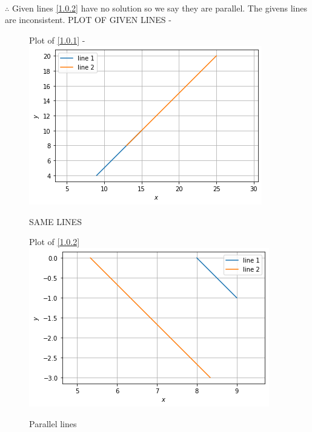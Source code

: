 \documentclass[journal,12pt,twocolumn]{IEEEtran}
\begin{document}
\begin{enumerate}
\begin{align}
\end{align}
$\therefore$ Given lines \eqref{1.0.2} have no solution so we say they are parallel. The givens lines are inconsistent. 
PLOT OF GIVEN LINES -
\begin{figure}[ht!]
Plot of \eqref{1.0.1} -
    \centering
    \includegraphics[width=\columnwidth]{consistent.png}
    \caption{SAME LINES}
    \label{fig:SAME LINES.}
\end{figure} 
\begin{figure}[ht]
Plot of \eqref{1.0.2} 
    \centering
   \includegraphics[width=\columnwidth]{inconsistent.png}
    \caption{Parallel lines}
    \label{fig: PARALLEL lines.}
\end{figure}    
\end{enumerate}
\end{document}

